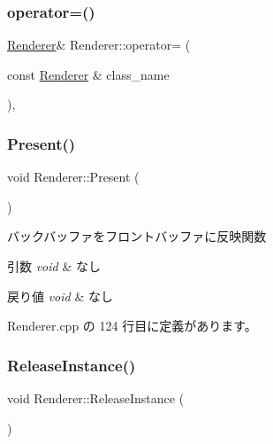 \subsubsection{\texorpdfstring{operator=()}{operator=()}}
{\footnotesize\ttfamily \mbox{\hyperlink{class_renderer}{Renderer}}\& Renderer\+::operator= (\begin{DoxyParamCaption}\item[{const \mbox{\hyperlink{class_renderer}{Renderer}} \&}]{class\+\_\+name }\end{DoxyParamCaption})\hspace{0.3cm}{\ttfamily [private]}, {\ttfamily [delete]}}

\mbox{\label{class_renderer_a1dac4baae1fa79166442b0778a9c8728}} 
\subsubsection{\texorpdfstring{Present()}{Present()}}
{\footnotesize\ttfamily void Renderer\+::\+Present (\begin{DoxyParamCaption}{ }\end{DoxyParamCaption})}



バックバッファをフロントバッファに反映関数 


\begin{DoxyParams}{引数}
{\em void} & なし \\
\hline
\end{DoxyParams}

\begin{DoxyRetVals}{戻り値}
{\em void} & なし \\
\hline
\end{DoxyRetVals}


 Renderer.\+cpp の 124 行目に定義があります。

\mbox{\label{class_renderer_aa7ac523172faaf376ecddaed4bdc0781}} 
\subsubsection{\texorpdfstring{Release\+Instance()}{ReleaseInstance()}}
{\footnotesize\ttfamily void Renderer\+::\+Release\+Instance (\begin{DoxyParamCaption}{ }\end{DoxyParamCaption})\hspace{0.3cm}{\ttfamily [static]}}



